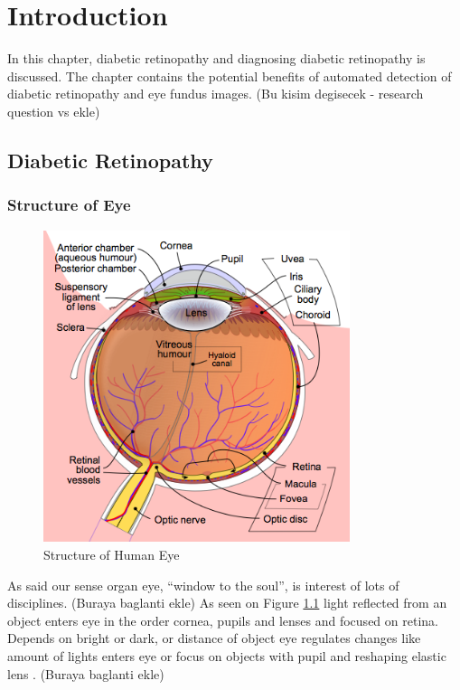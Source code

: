 \chapter{Introduction}
\label{intro}

In this chapter, diabetic retinopathy and diagnosing diabetic retinopathy is discussed. The chapter contains the potential benefits of automated detection of diabetic retinopathy and eye fundus images.  (Bu kisim degisecek - research question vs ekle)

\section{Diabetic Retinopathy}


\subsection{Structure of Eye}

\begin{figure}[t]
\centering
\includegraphics[width=0.8\textwidth]{Figures/structure_of_eye}
\caption{Structure of Human Eye \citep[from][]{WikipediaEN:AFM}}
\label{structureOfEye}
\end{figure}

As \citet{hughes2004anatomy} said our sense organ eye, ``window to the soul'', is interest of lots of disciplines. (Buraya baglanti ekle) As seen on Figure \ref{structureOfEye} light reflected from an object enters eye in the order cornea, pupils and lenses \citep{falt2012modern} and focused on retina. Depends on bright or dark, or distance of object eye regulates changes like amount of lights enters eye or focus on objects with pupil and reshaping elastic lens \citep{kauppi2010eye}. (Buraya baglanti ekle)

